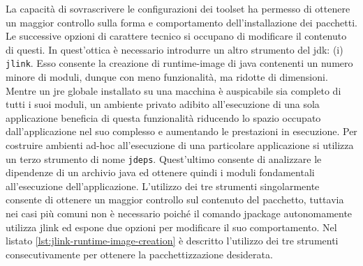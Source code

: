 La capacità di sovrascrivere le configurazioni dei toolset ha permesso di ottenere un maggior controllo sulla forma e comportamento dell'installazione dei pacchetti. Le successive opzioni di carattere tecnico si occupano di modificare il contenuto di questi. In quest'ottica è necessario introdurre un altro strumento del \ac{jdk}: (i) \texttt{jlink}. Esso consente la creazione di runtime-image di java contenenti un numero minore di moduli, dunque con meno funzionalità, ma ridotte di dimensioni. Mentre un \ac{jre} globale installato su una macchina è auspicabile sia completo di tutti i suoi moduli, un ambiente privato adibito all'esecuzione di una sola applicazione beneficia di questa funzionalità riducendo lo spazio occupato dall'applicazione nel suo complesso e aumentando le prestazioni in esecuzione. Per costruire ambienti ad-hoc all'esecuzione di una particolare applicazione si utilizza un terzo strumento di nome \texttt{jdeps}. Quest'ultimo consente di analizzare le dipendenze di un archivio java ed ottenere quindi i moduli fondamentali all'esecuzione dell'applicazione. L'utilizzo dei tre strumenti singolarmente consente di ottenere un maggior controllo sul contenuto del pacchetto, tuttavia nei casi più comuni non è necessario poiché il comando jpackage autonomamente utilizza jlink ed espone due opzioni per modificare il suo comportamento. Nel listato \ref{lst:jlink-runtime-image-creation} è descritto l'utilizzo dei tre strumenti consecutivamente per ottenere la pacchettizzazione desiderata.



